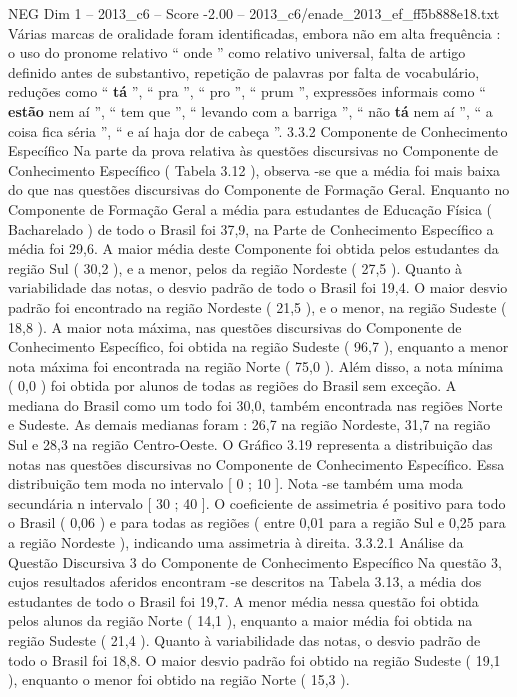 \begin{textsample}{NEG Dim 1 – 2013\_c6 – Score -2.00 – 2013\_c6/enade\_2013\_ef\_ff5b888e18.txt}
Várias marcas de oralidade foram identificadas, embora não em alta frequência : o uso do pronome relativo “ onde ” como relativo universal, falta de artigo definido antes de substantivo, repetição de palavras por falta de vocabulário, reduções como “ \textbf{tá} ”, “ pra ”, “ pro ”, “ prum ”, expressões informais como “ \textbf{estão} nem aí ”, “ tem que ”, “ levando com a barriga ”, “ não \textbf{tá} nem aí ”, “ a coisa fica séria ”, “ e aí haja dor de cabeça ”. 3.3.2 Componente de Conhecimento Específico Na parte da prova relativa às questões discursivas no Componente de Conhecimento Específico ( Tabela 3.12 ), observa -se que a média foi mais baixa do que nas questões discursivas do Componente de Formação Geral.
Enquanto no Componente de Formação Geral a média para estudantes de Educação Física ( Bacharelado ) de todo o Brasil foi 37,9, na Parte de Conhecimento Específico a média foi 29,6.
A maior média deste Componente foi obtida pelos estudantes da região Sul ( 30,2 ), e a menor, pelos da região Nordeste ( 27,5 ).
Quanto à variabilidade das notas, o desvio padrão de todo o Brasil foi 19,4.
O maior desvio padrão foi encontrado na região Nordeste ( 21,5 ), e o menor, na região Sudeste ( 18,8 ).
A maior nota máxima, nas questões discursivas do Componente de Conhecimento Específico, foi obtida na região Sudeste ( 96,7 ), enquanto a menor nota máxima foi encontrada na região Norte ( 75,0 ).
Além disso, a nota mínima ( 0,0 ) foi obtida por alunos de todas as regiões do Brasil sem exceção.
A mediana do Brasil como um todo foi 30,0, também encontrada nas regiões Norte e Sudeste.
As demais medianas foram : 26,7 na região Nordeste, 31,7 na região Sul e 28,3 na região Centro-Oeste.
O Gráfico 3.19 representa a distribuição das notas nas questões discursivas no Componente de Conhecimento Específico.
Essa distribuição tem moda no intervalo [ 0 ; 10 ].
Nota -se também uma moda secundária n intervalo [ 30 ; 40 ].
O coeficiente de assimetria é positivo para todo o Brasil ( 0,06 ) e para todas as regiões ( entre 0,01 para a região Sul e 0,25 para a região Nordeste ), indicando uma assimetria à direita. 3.3.2.1 Análise da Questão Discursiva 3 do Componente de Conhecimento Específico Na questão 3, cujos resultados aferidos encontram -se descritos na Tabela 3.13, a média dos estudantes de todo o Brasil foi 19,7.
A menor média nessa questão foi obtida pelos alunos da região Norte ( 14,1 ), enquanto a maior média foi obtida na região Sudeste ( 21,4 ).
Quanto à variabilidade das notas, o desvio padrão de todo o Brasil foi 18,8.
O maior desvio padrão foi obtido na região Sudeste ( 19,1 ), enquanto o menor foi obtido na região Norte ( 15,3 ).

\end{textsample}
